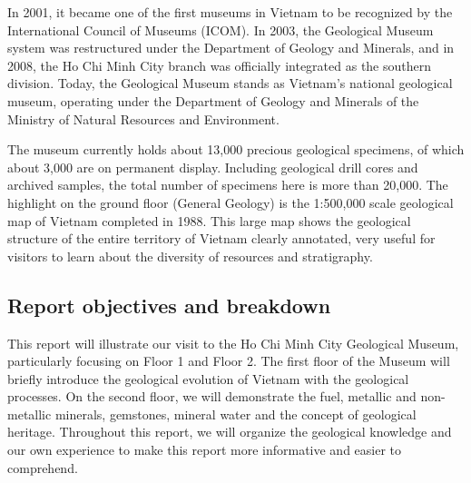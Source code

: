 In 2001, it became one of the first museums in Vietnam to be recognized by the International Council of Museums (ICOM). In 2003, the Geological Museum system was restructured under the Department of Geology and Minerals, and in 2008, the Ho Chi Minh City branch was officially integrated as the southern division. Today, the Geological Museum stands as Vietnam's national geological museum, operating under the Department of Geology and Minerals of the Ministry of Natural Resources and Environment.

The museum currently holds about 13,000 precious geological specimens, of which about 3,000 are on permanent display. Including geological drill cores and archived samples, the total number of specimens here is more than 20,000. The highlight on the ground floor (General Geology) is the 1:500,000 scale geological map of Vietnam completed in 1988. This large map shows the geological structure of the entire territory of Vietnam clearly annotated, very useful for visitors to learn about the diversity of resources and stratigraphy.

\subsection{Report objectives and breakdown}
\label{subsec:report-objectives}

This report will illustrate our visit to the Ho Chi Minh City Geological Museum, particularly focusing on Floor 1 and Floor 2. The first floor of the Museum will briefly introduce the geological evolution of Vietnam with the geological processes. On the second floor, we will demonstrate the fuel, metallic and non-metallic minerals, gemstones, mineral water and the concept of geological heritage. Throughout this report, we will organize the geological knowledge and our own experience to make this report more informative and easier to comprehend.
